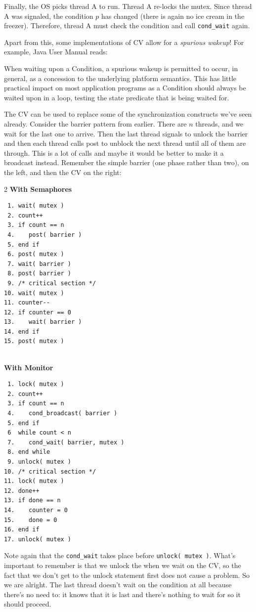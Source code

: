 Finally, the OS picks thread A to run.
Thread A re-locks the mutex.
Since thread A was signaled, the condition $p$ has changed (there is again no ice cream in the freezer).
Therefore, thread A must check the condition and call \texttt{cond\_wait} again.

Apart from this, some implementations of CV allow for a \emph{spurious wakeup}!
For example, Java User Manual reads:
\begin{displayquote}
	When waiting upon a Condition, a spurious wakeup is permitted to occur, in general, as a concession to the underlying platform semantics.
	This has little practical impact on most application programs as a Condition should always be waited upon in a loop, testing the state predicate that is being waited for.
\end{displayquote}

The CV can be used to replace some of the synchronization constructs we've seen already. Consider the barrier pattern from earlier. There are $n$ threads, and we wait for the last one to arrive. Then the last thread signals to unlock the barrier and then each thread calls post to unblock the next thread until all of them are through. This is a lot of calls and maybe it would be better to make it a broadcast instead. Remember the simple barrier (one phase rather than two), on the left, and then the CV on the right:

\newpage

\begin{multicols}{2}
	\textbf{With Semaphores}
	\begin{verbatim}
 1. wait( mutex )
 2. count++
 3. if count == n
 4.    post( barrier )
 5. end if
 6. post( mutex )
 7. wait( barrier )
 8. post( barrier )
 9. /* critical section */
10. wait( mutex )
11. counter--
12. if counter == 0
13.    wait( barrier )
14. end if
15. post( mutex )


	\end{verbatim}
	\columnbreak
	\textbf{With Monitor}
	\begin{verbatim}
 1. lock( mutex )
 2. count++
 3. if count == n
 4.    cond_broadcast( barrier )
 5. end if
 6  while count < n
 7.    cond_wait( barrier, mutex )
 8. end while
 9. unlock( mutex )
10. /* critical section */
11. lock( mutex )
12. done++
13. if done == n
14.    counter = 0
15.    done = 0
16. end if
17. unlock( mutex )
	\end{verbatim}
\end{multicols}

Note again that the \texttt{cond\_wait} takes place before \texttt{unlock( mutex )}. What's important to remember is that we unlock the  when we wait on the CV, so the fact that we don't get to the unlock statement first does not cause a problem. So we are alright. The last thread doesn't wait on the condition at all because there's no need to: it knows that it is last and there's nothing to wait for so it should proceed.

